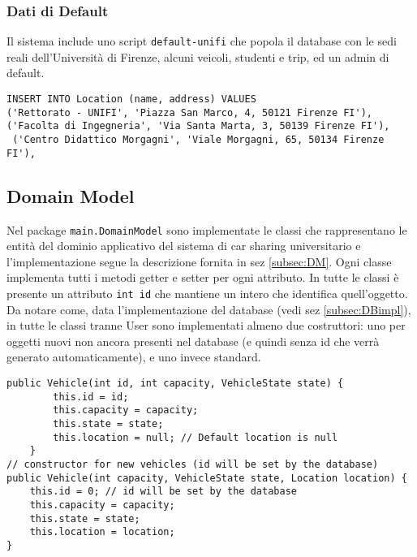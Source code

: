 \subsubsection{Dati di Default}
Il sistema include uno script \texttt{default-unifi} che popola il database con le sedi reali dell'Università di Firenze, alcuni veicoli, studenti e trip, ed un admin di default.
\begin{lstlisting}[style=sql, caption={Esempio inserimento dati di default per le location}]
INSERT INTO Location (name, address) VALUES
('Rettorato - UNIFI', 'Piazza San Marco, 4, 50121 Firenze FI'),
('Facolta di Ingegneria', 'Via Santa Marta, 3, 50139 Firenze FI'),
 ('Centro Didattico Morgagni', 'Viale Morgagni, 65, 50134 Firenze FI'),
\end{lstlisting}

\subsection{Domain Model}
Nel package \texttt{main.DomainModel} sono implementate le classi che rappresentano le entità del dominio applicativo del sistema di car sharing universitario e  l'implementazione segue la descrizione fornita in sez \ref{subsec:DM}. Ogni classe implementa tutti i metodi getter e setter per ogni attributo.
In tutte le classi è presente un attributo \texttt{int id} che mantiene un intero che identifica quell'oggetto.\\
Da notare come, data l'implementazione del database (vedi sez \ref{subsec:DBimpl}), in tutte le classi tranne User sono implementati almeno due costruttori: uno per oggetti nuovi non ancora presenti nel database (e quindi senza id che verrà generato automaticamente), e uno invece standard.
\begin{lstlisting}[style=java, caption={Esempio di costruttori della classe \texttt{Vehicle}}]
public Vehicle(int id, int capacity, VehicleState state) {
        this.id = id;
        this.capacity = capacity;
        this.state = state;
        this.location = null; // Default location is null
    }
// constructor for new vehicles (id will be set by the database)
public Vehicle(int capacity, VehicleState state, Location location) {
    this.id = 0; // id will be set by the database
    this.capacity = capacity;
    this.state = state;
    this.location = location;
}
\end{lstlisting}
